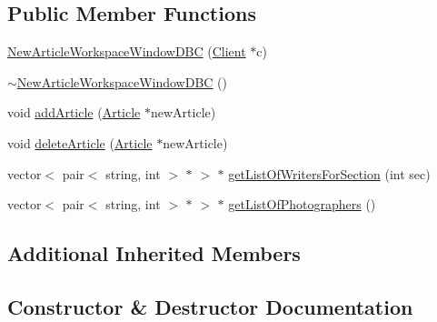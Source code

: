 \subsection*{Public Member Functions}
\begin{DoxyCompactItemize}
\item 
\hyperlink{class_new_article_workspace_window_d_b_c_a1e41183bd9bf25499bbc88a0ba5b47bc}{New\+Article\+Workspace\+Window\+D\+B\+C} (\hyperlink{class_client}{Client} $\ast$c)
\item 
\hyperlink{class_new_article_workspace_window_d_b_c_afab34305857c7b92df698208ed362954}{$\sim$\+New\+Article\+Workspace\+Window\+D\+B\+C} ()
\item 
void \hyperlink{class_new_article_workspace_window_d_b_c_a631b58213f3620f5c822a23d749e3003}{add\+Article} (\hyperlink{class_article}{Article} $\ast$new\+Article)
\item 
void \hyperlink{class_new_article_workspace_window_d_b_c_a9138045fddc4a452b571305b0b50264e}{delete\+Article} (\hyperlink{class_article}{Article} $\ast$new\+Article)
\item 
vector$<$ pair$<$ string, int $>$ $\ast$ $>$ $\ast$ \hyperlink{class_new_article_workspace_window_d_b_c_aa0ac3e7f4adc1ea64885d6b51f73c9e7}{get\+List\+Of\+Writers\+For\+Section} (int sec)
\item 
vector$<$ pair$<$ string, int $>$ $\ast$ $>$ $\ast$ \hyperlink{class_new_article_workspace_window_d_b_c_af560934ff22013b07cf351d4f65ca50b}{get\+List\+Of\+Photographers} ()
\end{DoxyCompactItemize}
\subsection*{Additional Inherited Members}


\subsection{Constructor \& Destructor Documentation}
\hypertarget{class_new_article_workspace_window_d_b_c_a1e41183bd9bf25499bbc88a0ba5b47bc}{}
